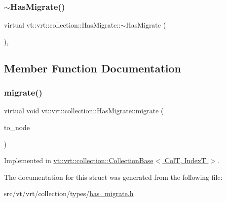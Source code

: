 \subsubsection{\texorpdfstring{$\sim$\+Has\+Migrate()}{~HasMigrate()}}
{\footnotesize\ttfamily virtual vt\+::vrt\+::collection\+::\+Has\+Migrate\+::$\sim$\+Has\+Migrate (\begin{DoxyParamCaption}{ }\end{DoxyParamCaption})\hspace{0.3cm}{\ttfamily [virtual]}, {\ttfamily [default]}}



\subsection{Member Function Documentation}
\mbox{\label{structvt_1_1vrt_1_1collection_1_1_has_migrate_a6cd6f43660771bf45e205e4c8ee7ff90}} 
\subsubsection{\texorpdfstring{migrate()}{migrate()}}
{\footnotesize\ttfamily virtual void vt\+::vrt\+::collection\+::\+Has\+Migrate\+::migrate (\begin{DoxyParamCaption}\item[{\hyperlink{namespacevt_a866da9d0efc19c0a1ce79e9e492f47e2}{Node\+Type} const \&}]{to\+\_\+node }\end{DoxyParamCaption})\hspace{0.3cm}{\ttfamily [pure virtual]}}



Implemented in \hyperlink{structvt_1_1vrt_1_1collection_1_1_collection_base_a34f089d6f08e84b1745a265ad865807a}{vt\+::vrt\+::collection\+::\+Collection\+Base$<$ Col\+T, Index\+T $>$}.



The documentation for this struct was generated from the following file\+:\begin{DoxyCompactItemize}
\item 
src/vt/vrt/collection/types/\hyperlink{has__migrate_8h}{has\+\_\+migrate.\+h}\end{DoxyCompactItemize}
